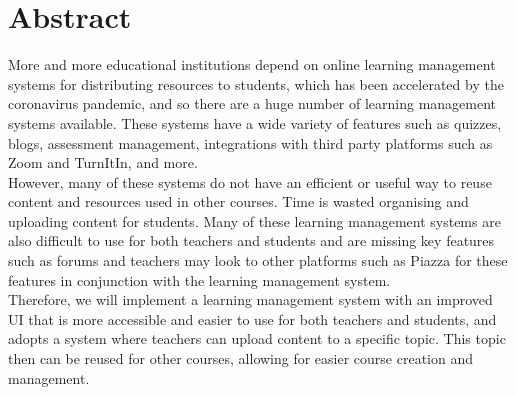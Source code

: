 \chapter*{Abstract}\label{abstract}
More and more educational institutions depend on online learning management systems for distributing resources to students, which has been accelerated by the coronavirus pandemic, and so there are a huge number of learning management systems available. These systems have a wide variety of features such as quizzes, blogs, assessment management, integrations with third party platforms such as Zoom and TurnItIn, and more. \\

However, many of these systems do not have an efficient or useful way to reuse content and resources used in other courses. Time is wasted organising and uploading content for students. Many of these learning management systems are also difficult to use for both teachers and students and are missing key features such as forums and teachers may look to other platforms such as Piazza for these features in conjunction with the learning management system. \\

Therefore, we will implement a learning management system with an improved UI that is more accessible and easier to use for both teachers and students, and adopts a system where teachers can upload content to a specific topic. This topic then can be reused for other courses, allowing for easier course creation and management.